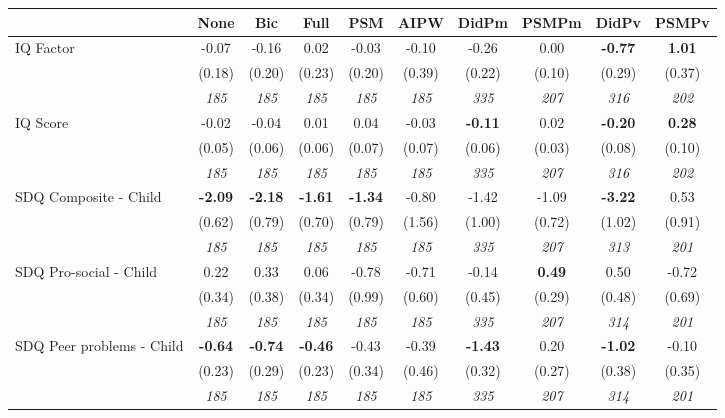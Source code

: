 \begin{tabular}{l c c c c c c c c c}
\toprule
 & None & Bic & Full & PSM & AIPW & DidPm & PSMPm & DidPv & PSMPv \\
\midrule
IQ Factor & -0.07 & -0.16 & 0.02 & -0.03 & -0.10 & -0.26 & 0.00 & \textbf{ -0.77 } & \textbf{1.01} \\
& (0.18) & (0.20) & (0.23) & (0.20) & (0.39) & (0.22) & (0.10) & (0.29) & (0.37) \\
& \textit{ 185 } & \textit{ 185 } & \textit{ 185 } & \textit{ 185 } & \textit{ 185 } & \textit{ 335 } & \textit{ 207 } & \textit{ 316 } & \textit{ 202 } \\
IQ Score & -0.02 & -0.04 & 0.01 & 0.04 & -0.03 & \textbf{ -0.11 } & 0.02 & \textbf{ -0.20 } & \textbf{0.28} \\
& (0.05) & (0.06) & (0.06) & (0.07) & (0.07) & (0.06) & (0.03) & (0.08) & (0.10) \\
& \textit{ 185 } & \textit{ 185 } & \textit{ 185 } & \textit{ 185 } & \textit{ 185 } & \textit{ 335 } & \textit{ 207 } & \textit{ 316 } & \textit{ 202 } \\
SDQ Composite - Child & \textbf{ -2.09 } & \textbf{ -2.18 } & \textbf{ -1.61 } & \textbf{-1.34} & -0.80 & -1.42 & -1.09 & \textbf{ -3.22 } & 0.53 \\
& (0.62) & (0.79) & (0.70) & (0.79) & (1.56) & (1.00) & (0.72) & (1.02) & (0.91) \\
& \textit{ 185 } & \textit{ 185 } & \textit{ 185 } & \textit{ 185 } & \textit{ 185 } & \textit{ 335 } & \textit{ 207 } & \textit{ 313 } & \textit{ 201 } \\
SDQ Pro-social - Child & 0.22 & 0.33 & 0.06 & -0.78 & -0.71 & -0.14 & \textbf{0.49} & 0.50 & -0.72 \\
& (0.34) & (0.38) & (0.34) & (0.99) & (0.60) & (0.45) & (0.29) & (0.48) & (0.69) \\
& \textit{ 185 } & \textit{ 185 } & \textit{ 185 } & \textit{ 185 } & \textit{ 185 } & \textit{ 335 } & \textit{ 207 } & \textit{ 314 } & \textit{ 201 } \\
SDQ Peer problems - Child & \textbf{ -0.64 } & \textbf{ -0.74 } & \textbf{ -0.46 } & -0.43 & -0.39 & \textbf{ -1.43 } & 0.20 & \textbf{ -1.02 } & -0.10 \\
& (0.23) & (0.29) & (0.23) & (0.34) & (0.46) & (0.32) & (0.27) & (0.38) & (0.35) \\
& \textit{ 185 } & \textit{ 185 } & \textit{ 185 } & \textit{ 185 } & \textit{ 185 } & \textit{ 335 } & \textit{ 207 } & \textit{ 314 } & \textit{ 201 } \\

\end{tabular}
